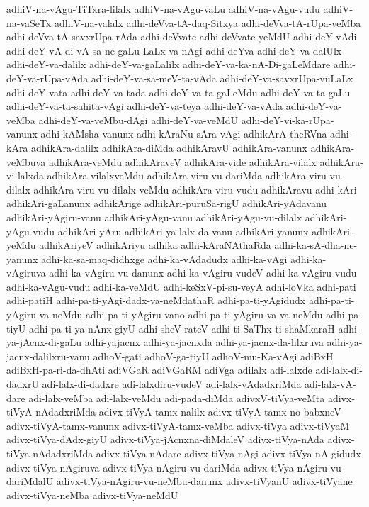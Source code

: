 {adhiV-na-vAgu-TiTxra-lilalx
adhiV-na-vAgu-vaLu
adhiV-na-vAgu-vudu
adhiV-na-vaSeTx
adhiV-na-valalx
adhi-deVva-tA-daq-Sitxya
adhi-deVva-tA-rUpa-veMba
adhi-deVva-tA-savxrUpa-rAda
adhi-deVvate
adhi-deVvate-yeMdU
adhi-deY-vAdi
adhi-deY-vA-di-vA-sa-ne-gaLu-LaLx-va-nAgi
adhi-deYva
adhi-deY-va-dalUlx
adhi-deY-va-dalilx
adhi-deY-va-gaLalilx
adhi-deY-va-ka-nA-Di-gaLeMdare
adhi-deY-va-rUpa-vAda
adhi-deY-va-sa-meV-ta-vAda
adhi-deY-va-savxrUpa-vuLaLx
adhi-deY-vata
adhi-deY-va-tada
adhi-deY-va-ta-gaLeMdu
adhi-deY-va-ta-gaLu
adhi-deY-va-ta-sahita-vAgi
adhi-deY-va-teya
adhi-deY-va-vAda
adhi-deY-va-veMba
adhi-deY-va-veMbu-dAgi
adhi-deY-va-veMdU
adhi-deY-vi-ka-rUpa-vanunx
adhi-kAMsha-vanunx
adhi-kAraNu-sAra-vAgi
adhikArA-theRVna
adhi-kAra
adhikAra-dalilx
adhikAra-diMda
adhikAravU
adhikAra-vanunx
adhikAra-veMbuva
adhikAra-veMdu
adhikAraveV
adhikAra-vide
adhikAra-vilalx
adhikAra-vi-lalxda
adhikAra-vilalxveMdu
adhikAra-viru-vu-dariMda
adhikAra-viru-vu-dilalx
adhikAra-viru-vu-dilalx-veMdu
adhikAra-viru-vudu
adhikAravu
adhi-kAri
adhikAri-gaLanunx
adhikArige
adhikAri-puruSa-rigU
adhikAri-yAdavanu
adhikAri-yAgiru-vanu
adhikAri-yAgu-vanu
adhikAri-yAgu-vu-dilalx
adhikAri-yAgu-vudu
adhikAri-yAru
adhikAri-ya-lalx-da-vanu
adhikAri-yanunx
adhikAri-yeMdu
adhikAriyeV
adhikAriyu
adhika
adhi-kAraNAthaRda
adhi-ka-sA-dha-ne-yanunx
adhi-ka-sa-maq-didhxge
adhi-ka-vAdadudx
adhi-ka-vAgi
adhi-ka-vAgiruva
adhi-ka-vAgiru-vu-danunx
adhi-ka-vAgiru-vudeV
adhi-ka-vAgiru-vudu
adhi-ka-vAgu-vudu
adhi-ka-veMdU
adhi-keSxV-pi-su-veyA
adhi-loVka
adhi-pati
adhi-patiH
adhi-pa-ti-yAgi-dadx-va-neMdathaR
adhi-pa-ti-yAgidudx
adhi-pa-ti-yAgiru-va-neMdu
adhi-pa-ti-yAgiru-vano
adhi-pa-ti-yAgiru-va-va-neMdu
adhi-pa-tiyU
adhi-pa-ti-ya-nAnx-giyU
adhi-sheV-rateV
adhi-ti-SaThx-ti-shaMkaraH
adhi-ya-jAcnx-di-gaLu
adhi-yajacnx
adhi-ya-jacnxda
adhi-ya-jacnx-da-lilxruva
adhi-ya-jacnx-dalilxru-vanu
adhoV-gati
adhoV-ga-tiyU
adhoV-mu-Ka-vAgi
adiBxH
adiBxH-pa-ri-da-dhAti
adiVGaR
adiVGaRM
adiVga
adilalx
adi-lalxde
adi-lalx-di-dadxrU
adi-lalx-di-dadxre
adi-lalxdiru-vudeV
adi-lalx-vAdadxriMda
adi-lalx-vA-dare
adi-lalx-veMba
adi-lalx-veMdu
adi-pada-diMda
adivxV-tiVya-veMta
adivx-tiVyA-nAdadxriMda
adivx-tiVyA-tamx-nalilx
adivx-tiVyA-tamx-no-babxneV
adivx-tiVyA-tamx-vanunx
adivx-tiVyA-tamx-veMba
adivx-tiVya
adivx-tiVyaM
adivx-tiVya-dAdx-giyU
adivx-tiVya-jAcnxna-diMdaleV
adivx-tiVya-nAda
adivx-tiVya-nAdadxriMda
adivx-tiVya-nAdare
adivx-tiVya-nAgi
adivx-tiVya-nA-gidudx
adivx-tiVya-nAgiruva
adivx-tiVya-nAgiru-vu-dariMda
adivx-tiVya-nAgiru-vu-dariMdalU
adivx-tiVya-nAgiru-vu-neMbu-danunx
adivx-tiVyanU
adivx-tiVyane
adivx-tiVya-neMba
adivx-tiVya-neMdU
}
